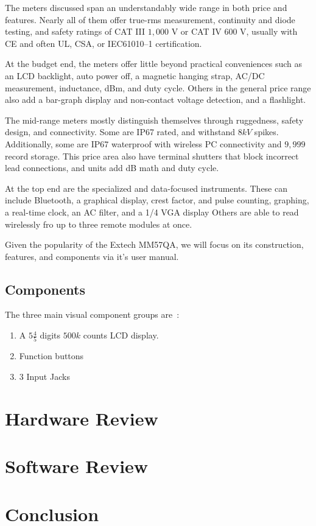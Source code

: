 \documentclass{article}
\begin{document}
    The meters discussed span an understandably wide range in both price and features.
    Nearly all of them offer true-rms measurement, continuity and diode testing, and safety ratings of CAT III $1,000$ V or CAT IV $600$ V,
    usually with CE and often UL, CSA, or IEC61010--1 certification.


    At the budget end, the meters offer little beyond practical conveniences such as an LCD backlight, auto power
    off, a magnetic hanging strap, AC/DC measurement, inductance, dBm, and duty cycle.
    Others in the general price range also add a bar-graph display and non-contact voltage detection, and a flashlight.

    The mid-range meters mostly distinguish themselves through ruggedness, safety design, and connectivity.
    Some are IP67 rated, and withstand $8kV$ spikes.
    Additionally, some are IP67 waterproof with wireless PC connectivity and $9,999$ record storage.
    This price area also have terminal shutters that block incorrect lead connections, and units add dB math and
    duty cycle.

    At the top end are the specialized and data-focused instruments.
    These can include Bluetooth, a graphical display, crest factor, and pulse counting, graphing, a real-time
    clock, an AC filter, and a 1/4 VGA display Others are able to read wirelessly fro  up to three remote modules at
    once.

    Given the popularity of the Extech MM57QA, we will focus on its construction, features, and components via it's
    user manual.

    \subsection{Components}
    The three main visual component groups are~\parencite[4]{extech_mm57qa}:
    \begin{enumerate}
        \item A $5\frac{4}{5}$ digits $500k$ counts LCD display.
        \item Function buttons
        \item $3$ Input Jacks
    \end{enumerate}
    \section{Hardware Review}\label{sec:hard_rev}
    \section{Software Review}\label{sec:soft_rev}
    \section{Conclusion}\label{sec:conc}
    \printbibliography
\end{document}
